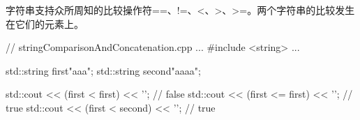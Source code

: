 字符串支持众所周知的比较操作符==、!=、<、>、>=。两个字符串的比较发生在它们的元素上。


\begin{cpp}
// stringComparisonAndConcatenation.cpp
...
#include <string>
...

std::string first{"aaa"};
std::string second{"aaaa"};

std::cout << (first < first) << '\n'; // false
std::cout << (first <= first) << '\n'; // true
std::cout << (first < second) << '\n'; // true
\end{cpp}
